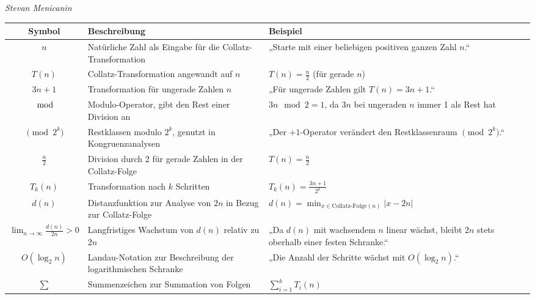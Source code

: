 \documentclass[a4paper,12pt]{article}
\begin{document}
\vspace{1cm}
\begin{flushright}
\textit{Stevan Menicanin}
\end{flushright}


\newpage
\pagestyle{empty}  %
\clearpage

\begin{table}[h!]
    \centering
    \begin{tabular}{|c|p{7cm}|p{5cm}|}
    \hline
    \textbf{Symbol} & \textbf{Beschreibung} & \textbf{Beispiel} \\ \hline
    \( n \) & Natürliche Zahl als Eingabe für die Collatz-Transformation & „Starte mit einer beliebigen positiven ganzen Zahl \( n \).“ \\ \hline
    \( T(n) \) & Collatz-Transformation angewandt auf \( n \) & \( T(n) = \frac{n}{2} \) (für gerade \( n \)) \\ \hline
    \( 3n + 1 \) & Transformation für ungerade Zahlen \( n \) & „Für ungerade Zahlen gilt \( T(n) = 3n + 1 \).“ \\ \hline
    \( \mod \) & Modulo-Operator, gibt den Rest einer Division an & \( 3n \mod 2 = 1 \), da \( 3n \) bei ungeraden \( n \) immer 1 als Rest hat \\ \hline
    \( \pmod{2^k} \) & Restklassen modulo \( 2^k \), genutzt in Kongruenzanalysen & „Der \(+1\)-Operator verändert den Restklassenraum \( \pmod{2^k} \).“ \\ \hline
    \( \frac{n}{2} \) & Division durch 2 für gerade Zahlen in der Collatz-Folge & \( T(n) = \frac{n}{2} \) \\ \hline
    \( T_k(n) \) & Transformation nach \( k \) Schritten & \( T_k(n) = \frac{3n + 1}{2^k} \) \\ \hline
    \( d(n) \) & Distanzfunktion zur Analyse von \( 2n \) in Bezug zur Collatz-Folge & \( d(n) = \min_{x \in \text{Collatz-Folge}(n)} |x - 2n| \) \\ \hline
    \( \lim_{n \to \infty} \frac{d(n)}{2n} > 0 \) & Langfristiges Wachstum von \( d(n) \) relativ zu \( 2n \) & „Da \( d(n) \) mit wachsendem \( n \) linear wächst, bleibt \( 2n \) stets oberhalb einer festen Schranke.“ \\ \hline
    \( O(\log_2 n) \) & Landau-Notation zur Beschreibung der logarithmischen Schranke & „Die Anzahl der Schritte wächst mit \( O(\log_2 n) \).“ \\ \hline
    \( \sum \) & Summenzeichen zur Summation von Folgen & \( \sum_{i=1}^k T_i(n) \) \\ \hline

\end{tabular}
\end{table}
\end{document}
